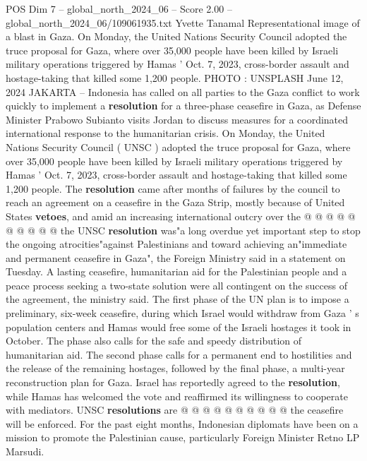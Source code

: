 \begin{textsample}{POS Dim 7 – global\_north\_2024\_06 – Score 2.00 – global\_north\_2024\_06/109061935.txt}  \label{ex:f7_pos_319}
Yvette Tanamal Representational image of a blast in Gaza.
On Monday, the United Nations Security Council adopted the truce proposal for Gaza, where over 35,000 people have been killed by Israeli military operations triggered by Hamas ' Oct. 7, 2023, cross-border assault and hostage-taking that killed some 1,200 people.
PHOTO : UNSPLASH June 12, 2024 JAKARTA -- Indonesia has called on all parties to the Gaza conflict to work quickly to implement a \textbf{resolution} for a three-phase ceasefire in Gaza, as Defense Minister Prabowo Subianto visits Jordan to discuss measures for a coordinated international response to the humanitarian crisis.
On Monday, the United Nations Security Council ( UNSC ) adopted the truce proposal for Gaza, where over 35,000 people have been killed by Israeli military operations triggered by Hamas ' Oct. 7, 2023, cross-border assault and hostage-taking that killed some 1,200 people.
The \textbf{resolution} came after months of failures by the council to reach an agreement on a ceasefire in the Gaza Strip, mostly because of United States \textbf{vetoes}, and amid an increasing international outcry over the @ @ @ @ @ @ @ @ @ @ the UNSC \textbf{resolution} was"a long overdue yet important step to stop the ongoing atrocities"against Palestinians and toward achieving an"immediate and permanent ceasefire in Gaza", the Foreign Ministry said in a statement on Tuesday.
A lasting ceasefire, humanitarian aid for the Palestinian people and a peace process seeking a two-state solution were all contingent on the success of the agreement, the ministry said.
The first phase of the UN plan is to impose a preliminary, six-week ceasefire, during which Israel would withdraw from Gaza ' s population centers and Hamas would free some of the Israeli hostages it took in October.
The phase also calls for the safe and speedy distribution of humanitarian aid.
The second phase calls for a permanent end to hostilities and the release of the remaining hostages, followed by the final phase, a multi-year reconstruction plan for Gaza.
Israel has reportedly agreed to the \textbf{resolution}, while Hamas has welcomed the vote and reaffirmed its willingness to cooperate with mediators.
UNSC \textbf{resolutions} are @ @ @ @ @ @ @ @ @ @ the ceasefire will be enforced.
For the past eight months, Indonesian diplomats have been on a mission to promote the Palestinian cause, particularly Foreign Minister Retno LP Marsudi.

\end{textsample}
